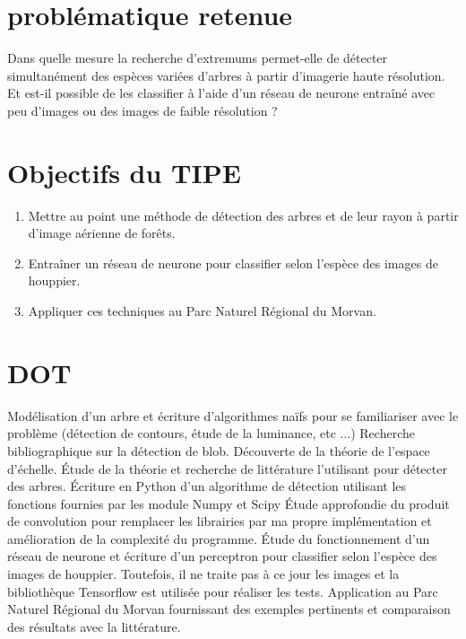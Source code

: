 \documentclass{article}
\begin{document}
\section{problématique retenue}

Dans quelle mesure la recherche d'extremums permet-elle de détecter simultanément des espèces variées d'arbres à partir d'imagerie haute résolution. Et est-il possible de les classifier à l'aide d'un réseau de neurone entraîné avec peu d'images ou des images de faible résolution ? 

\section{Objectifs du TIPE}

\begin{enumerate}
	\item Mettre au point une méthode de détection des arbres et de leur rayon à partir d'image aérienne de forêts.  
    \item Entraîner un réseau de neurone pour classifier selon l'espèce des images de houppier.
	\item Appliquer ces techniques au Parc Naturel Régional du Morvan.   
\end{enumerate}
	
\section{DOT}

Modélisation d'un arbre et écriture d'algorithmes naïfs pour se familiariser avec le problème (détection de contours, étude de la luminance, etc ...)
Recherche bibliographique sur la détection de blob. Découverte de la théorie de l'espace d'échelle.
Étude de la théorie et recherche de littérature l'utilisant pour détecter des arbres.
Écriture en Python d'un algorithme de détection utilisant les fonctions fournies par les module Numpy et Scipy 
Étude approfondie du produit de convolution pour remplacer les librairies par ma propre implémentation et amélioration de la complexité du programme. 
Étude du fonctionnement d'un réseau de neurone et écriture d'un perceptron pour classifier selon l'espèce des images de houppier. Toutefois, il ne traite pas à ce jour les images et la bibliothèque Tensorflow est utilisée pour réaliser les tests.
Application au Parc Naturel Régional du Morvan fournissant des exemples pertinents et comparaison des résultats avec la littérature.
\end{document}
